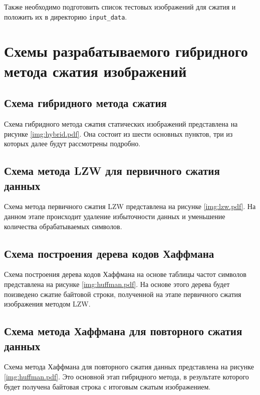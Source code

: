 Также необходимо подготовить список тестовых изображений для сжатия и положить их в директорию \texttt{input\_data}.


\section{Схемы разрабатываемого гибридного метода \mbox{сжатия} \mbox{изображений}}

\subsection{Схема гибридного метода сжатия}

Схема гибридного метода сжатия статических изображений представлена на рисунке \ref{img:hybrid.pdf}. Она состоит из шести основных пунктов, три из которых далее будут рассмотрены подробно.

\clearpage
\subsection{Схема метода LZW для первичного сжатия \mbox{данных}}

Схема метода первичного сжатия LZW представлена на рисунке \ref{img:lzw.pdf}. На данном этапе происходит удаление избыточности данных и уменьшение количества обрабатываемых символов.

\clearpage
\subsection{Схема построения дерева кодов Хаффмана}

Схема построения дерева кодов Хаффмана на основе таблицы частот символов представлена на рисунке \ref{img:huffman.pdf}. На основе этого дерева будет поизведено сжатие байтовой строки, полученной на этапе первичного сжатия изображения методом LZW.

\clearpage
\subsection{Схема метода Хаффмана для повторного \mbox{сжатия} данных}

Схема метода Хаффмана для повторного сжатия данных представлена на рисунке \ref{img:huffman.pdf}. Это основной этап гибридного метода, в результате которого будет получена байтовая строка с итоговым сжатым изображением.

